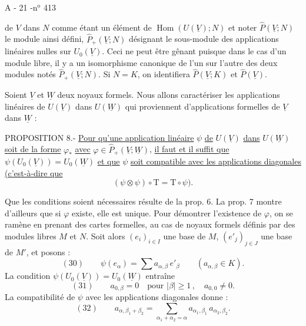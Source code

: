 \begin{center}A - 21 -\hfill n$^{\mathrm o}$ 413\end{center}

de $V$ dans $N$ comme étant un élément de $\operatorname{Hom}(U(\underline V);N)$ et noter $\widehat P(\underline V;N)$ le module ainsi défini, $\widehat P_+(\underline V;N)$ désignant le sous-module des applications linéaires nulles sur $U_0(\underline V)$. Ceci ne peut être gênant puisque dans le cas d'un module libre, il y a un isomorphisme canonique de l'un sur l'autre des deux modules notés $\widehat P_+(\underline V;N)$. Si $N=K$, on identifiera $\widehat P(\underline V;K)$ et $\widehat P(\underline V)$.

Soient $\underline V$ et $\underline W$ deux noyaux formels. Nous allons caractériser les applications linéaires de $U(\underline V)$ dans $U(\underline W)$ qui proviennent d'applications formelles de $\underline V$ dans $\underline W$ :

PROPOSITION 8.- \uline{Pour qu'une application linéaire} $\psi$ \uline{de} $U(\underline V)$ \uline{dans} $U(\underline W)$ \uline{soit de la forme} $\varphi_*$ \uline{avec} $\varphi\in\widehat P_+(\underline V;\underline W)$, \uline{il faut et il suffit que} $\psi(U_0(\underline V))=U_0(\underline W)$ \uline{et que} $\psi$ \uline{soit compatible avec les applications diagonales} \uline{(c'est-à-dire que}
\[
(\psi\otimes\psi)\circ\mathrm T=\mathrm T\circ\psi).
\]

Que les conditions soient nécessaires résulte de la prop. 6. La prop. 7 montre d'ailleurs que si $\varphi$ existe, elle est unique. Pour démontrer l'existence de $\varphi$, on se ramène en prenant des cartes formelles, au cas de noyaux formels définis par des modules libres $M$ et $N$. Soit alors $(e_i)_{i\in I}$ une base de $M$, $(e'_j)_{j\in J}$ une base de $M'$, et posons :
\[
(30)\qquad \psi(e_\alpha)=\sum a_{\alpha,\beta}\,e'_\beta
\qquad (a_{\alpha,\beta}\in K).
\]
La condition $\psi(U_0(\underline V))=U_0(\underline W)$ entraîne
\[
(31)\qquad a_{0,\beta}=0\quad\text{pour }|\beta|\geq 1\,,\quad a_{0,0}\neq 0.
\]
La compatibilité de $\psi$ avec les applications diagonales donne :
\[
(32)\qquad a_{\alpha,\beta_1+\beta_2}=\sum_{\alpha_1+\alpha_2=\alpha}a_{\alpha_1,\beta_1}\,a_{\alpha_2,\beta_2}.
\]
